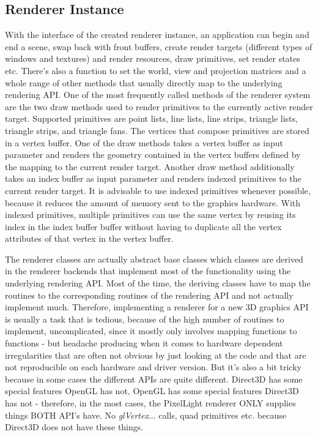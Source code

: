\subsection{Renderer Instance}
With the interface of the created renderer instance, an application can begin and end a scene, swap back with front buffers, create render targets (different types of windows and textures) and render resources, draw primitives, set render states etc. There's also a function to set the world, view and projection matrices and a whole range of other methods that usually directly map to the underlying rendering API. One of the most frequently called methods of the renderer system are the two draw methods used to render primitives to the currently active render target. Supported primitives are point lists, line lists, line strips, triangle lists, triangle strips, and triangle fans. The vertices that compose primitives are stored in a vertex buffer. One of the draw methods takes a vertex buffer as input parameter and renders the geometry contained in the vertex buffers defined by the mapping to the current render target. Another draw method additionally takes an index buffer as input parameter and renders indexed primitives to the current render target. It is advisable to use indexed primitives whenever possible, because it reduces the amount of memory sent to the graphics hardware. With indexed primitives, multiple primitives can use the same vertex by reusing its index in the index buffer buffer without having to duplicate all the vertex attributes of that vertex in the vertex buffer.

The renderer classes are actually abstract base classes which classes are derived in the renderer backends that implement most of the functionality using the underlying rendering API. Most of the time, the deriving classes have to map the routines to the corresponding routines of the rendering API and not actually implement much. Therefore, implementing a renderer for a new 3D graphics API is usually a task that is tedious, because of the high number of routines to implement, uncomplicated, since it mostly only involves mapping functions to functions - but headache producing when it comes to hardware dependent irregularities that are often not obvious by just looking at the code and that are not reproducible on each hardware and driver version. But it's also a bit tricky because in some cases the different APIs are quite different. Direct3D has some special features OpenGL has not, OpenGL has some special features Direct3D has not - therefore, in the most cases, the PixelLight renderer ONLY supplies things BOTH API's have. No \emph{glVertex}... calls, quad primitives etc. because Direct3D does not have these things.




